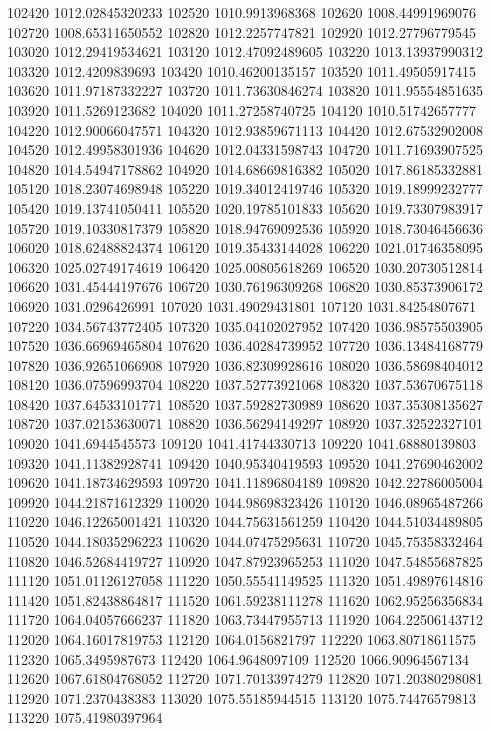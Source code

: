 {102420 1012.02845320233
102520 1010.9913968368
102620 1008.44991969076
102720 1008.65311650552
102820 1012.2257747821
102920 1012.27796779545
103020 1012.29419534621
103120 1012.47092489605
103220 1013.13937990312
103320 1012.4209839693
103420 1010.46200135157
103520 1011.49505917415
103620 1011.97187332227
103720 1011.73630846274
103820 1011.95554851635
103920 1011.5269123682
104020 1011.27258740725
104120 1010.51742657777
104220 1012.90066047571
104320 1012.93859671113
104420 1012.67532902008
104520 1012.49958301936
104620 1012.04331598743
104720 1011.71693907525
104820 1014.54947178862
104920 1014.68669816382
105020 1017.86185332881
105120 1018.23074698948
105220 1019.34012419746
105320 1019.18999232777
105420 1019.13741050411
105520 1020.19785101833
105620 1019.73307983917
105720 1019.10330817379
105820 1018.94769092536
105920 1018.73046456636
106020 1018.62488824374
106120 1019.35433144028
106220 1021.01746358095
106320 1025.02749174619
106420 1025.00805618269
106520 1030.20730512814
106620 1031.45444197676
106720 1030.76196309268
106820 1030.85373906172
106920 1031.0296426991
107020 1031.49029431801
107120 1031.84254807671
107220 1034.56743772405
107320 1035.04102027952
107420 1036.98575503905
107520 1036.66969465804
107620 1036.40284739952
107720 1036.13484168779
107820 1036.92651066908
107920 1036.82309928616
108020 1036.58698404012
108120 1036.07596993704
108220 1037.52773921068
108320 1037.53670675118
108420 1037.64533101771
108520 1037.59282730989
108620 1037.35308135627
108720 1037.02153630071
108820 1036.56294149297
108920 1037.32522327101
109020 1041.6944545573
109120 1041.41744330713
109220 1041.68880139803
109320 1041.11382928741
109420 1040.95340419593
109520 1041.27690462002
109620 1041.18734629593
109720 1041.11896804189
109820 1042.22786005004
109920 1044.21871612329
110020 1044.98698323426
110120 1046.08965487266
110220 1046.12265001421
110320 1044.75631561259
110420 1044.51034489805
110520 1044.18035296223
110620 1044.07475295631
110720 1045.75358332464
110820 1046.52684419727
110920 1047.87923965253
111020 1047.54855687825
111120 1051.01126127058
111220 1050.55541149525
111320 1051.49897614816
111420 1051.82438864817
111520 1061.59238111278
111620 1062.95256356834
111720 1064.04057666237
111820 1063.73447955713
111920 1064.22506143712
112020 1064.16017819753
112120 1064.0156821797
112220 1063.80718611575
112320 1065.3495987673
112420 1064.9648097109
112520 1066.90964567134
112620 1067.61804768052
112720 1071.70133974279
112820 1071.20380298081
112920 1071.2370438383
113020 1075.55185944515
113120 1075.74476579813
113220 1075.41980397964
}
